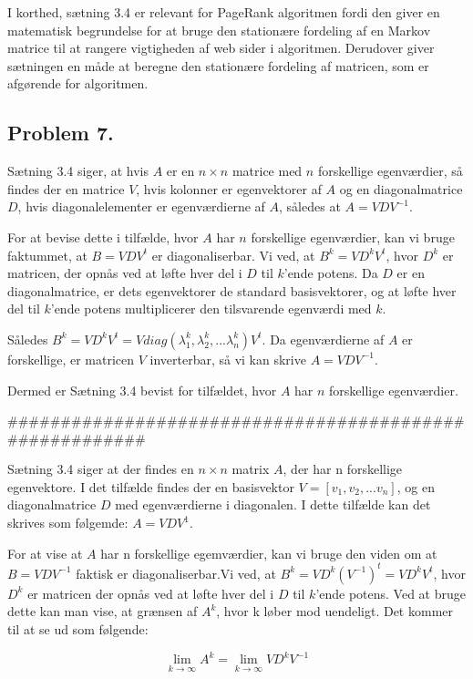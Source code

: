 I korthed, sætning 3.4 er relevant for PageRank algoritmen fordi den giver en matematisk begrundelse for at bruge den stationære fordeling af en Markov matrice til at rangere vigtigheden af web sider i algoritmen. Derudover giver sætningen en måde at beregne den stationære fordeling af matricen, som er afgørende for algoritmen.

\subsection*{Problem 7.}

Sætning 3.4 siger, at hvis $A$ er en $n \times n$ matrice med $n$ forskellige egenværdier, så findes der en matrice $V$, hvis kolonner er egenvektorer af $A$ og en diagonalmatrice $D$, hvis diagonalelementer er egenværdierne af $A$, således at $A = VDV^{-1}$.

For at bevise dette i tilfælde, hvor $A$ har $n$ forskellige egenværdier, kan vi bruge faktummet, at $B = V DV^{t}$ er diagonaliserbar. Vi ved, at $B^k = V D^{k} V^{t}$, hvor $D^{k}$ er matricen, der opnås ved at løfte hver del i $D$ til $k$'ende potens. Da $D$ er en diagonalmatrice, er dets egenvektorer de standard basisvektorer, og at løfte hver del til $k$'ende potens multiplicerer den tilsvarende egenværdi med $k$.

Således $B^k = V D^{k} V^{t} = V diag(\lambda_1^k, \lambda_2^k, . . . \lambda_n^k) V^{t}$. Da egenværdierne af $A$ er forskellige, er matricen $V$ inverterbar, så vi kan skrive $A = VDV^{-1}$.

Dermed er Sætning 3.4 bevist for tilfældet, hvor $A$ har $n$ forskellige egenværdier.



########################################################


Sætning 3.4 siger at der findes en $n \times n$ matrix $A$, der har n forskellige egenvektore. I det tilfælde findes der en basisvektor $V = [v_1,v_2,...v_n]$, og en diagonalmatrice $D$ med egenværdierne i diagonalen. I dette tilfælde kan det skrives som følgemde: $A=VDV^1$.

For at vise at $A$ har n forskellige egemværdier, kan vi bruge den viden om at $B = VDV^{-1}$ faktisk er diagonaliserbar.Vi ved, at $B^k = V D^k (V^{-1})^t = V D^k V^t$, hvor $D^k$ er matricen der opnås ved at løfte hver del i $D$ til $k$'ende potens. Ved at bruge dette kan man vise, at grænsen af $A^k$, hvor k løber mod uendeligt. Det kommer til at se ud som følgende:

$$\lim_{k \rightarrow \infty} A^k = \lim_{k \rightarrow \infty} V D^k V^{-1} $$

